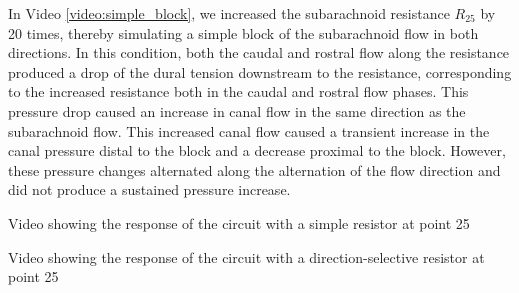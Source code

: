 \documentclass[fleqn,10pt]{wlscirep}
\begin{document}
In Video \ref{video:simple_block}, we increased the subarachnoid resistance
$R_{25}$ by 20 times, thereby simulating a simple block of the subarachnoid
flow in both directions. In this condition, both the caudal and rostral
flow along the resistance produced a drop of the dural tension downstream
to the resistance, corresponding to the increased resistance both in the
caudal and rostral flow phases. This pressure drop caused an increase in
canal flow in the same direction as the subarachnoid flow. This increased
canal flow caused a transient increase in the canal pressure distal to the
block and a decrease proximal to the block. However, these pressure changes
alternated along the alternation of the flow direction and did not produce
a sustained pressure increase.

\begin{video}[hbt]
    \caption{Video showing the response of the circuit with a simple
    resistor at point 25}
    \label{video:simple_block}
\end{video}

\begin{video}[hbt]
    \caption{Video showing the response of the circuit with a
    direction-selective resistor at point 25}
    \label{video:oneway}
\end{video}
\end{document}
